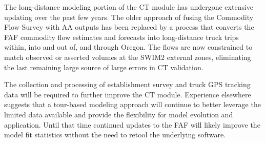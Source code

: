 The long-distance modeling portion of the CT module has undergone extensive updating over the past few years. The older approach of fusing the Commodity Flow Survey with AA outputs has been replaced by a process that converts the FAF commodity flow estimates and forecasts into long-distance truck trips within, into and out of, and through Oregon. The flows are now constrained to match observed or asserted volumes at the SWIM2 external zones, eliminating the last remaining large source of large errors in CT validation. 

The collection and processing of establishment survey and truck GPS tracking data will be required to further improve the CT module. Experience elsewhere suggests that a tour-based modeling approach will continue to better leverage the limited data available and provide the flexibility for model evolution and application. Until that time continued updates to the FAF will likely improve the model fit statistics without the need to retool the underlying software.
